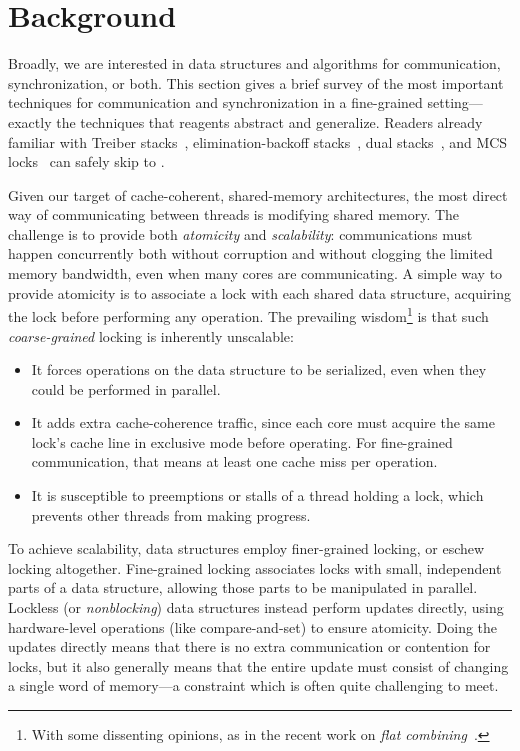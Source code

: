 \documentclass[preprint,nocopyrightspace]{sigplanconf}
\begin{document}

\section{Background}
\label{sec:background}

Broadly, we are interested in data structures and algorithms for
communication, synchronization, or both.  This section gives a brief survey of
the most important techniques for communication and synchronization in a
fine-grained setting---exactly the techniques that reagents abstract and
generalize.  Readers already familiar with Treiber stacks~\cite{Treiber1986},
elimination-backoff stacks~\cite{Hendler2004}, dual stacks~\cite{Scherer2004},
and MCS locks~\cite{Mellor-Crummey1991} can safely skip to .


Given our target of cache-coherent, shared-memory architectures, the
most direct way of communicating between threads is modifying shared
memory.  The challenge is to provide both \emph{atomicity} and
\emph{scalability}: communications must happen concurrently both
without corruption and without clogging the limited memory bandwidth,
even when many cores are communicating.  A simple way to provide
atomicity is to associate a lock with each shared data structure,
acquiring the lock before performing any operation.  The prevailing
wisdom\footnote{With some dissenting opinions, as in the recent work on
  \emph{flat combining}~\cite{Hendler2010}.} is
that such \emph{coarse-grained} locking is inherently unscalable:
\begin{itemize}
\item It forces operations on the data structure to be serialized,
  even when they could be performed in parallel.
\item It adds extra cache-coherence traffic, since each core must
  acquire the same lock's cache line in exclusive mode before
  operating.  For fine-grained communication, that means at least one
  cache miss per operation.
\item It is susceptible to preemptions or stalls of a
  thread holding a lock, which prevents other threads from making progress.
\end{itemize}

To achieve scalability, data structures employ finer-grained locking,
or eschew locking altogether.  Fine-grained locking associates locks
with small, independent parts of a data structure, allowing those
parts to be manipulated in parallel.  Lockless (or \emph{nonblocking})
data structures instead perform updates directly, using hardware-level
operations (like compare-and-set) to ensure atomicity.  Doing the
updates directly means that there is no extra communication or
contention for locks, but it also generally means that the entire
update must consist of changing a single word of memory---a constraint
which is often quite challenging to meet.
\end{document}
